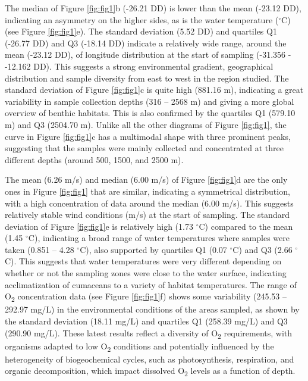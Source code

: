 The median of Figure \ref{fig:fig1}b (-26.21 DD) is lower than the mean (-23.12 DD), indicating an asymmetry on the higher sides, as is the water temperature ($^\circ$C) (see Figure \ref{fig:fig1}e). The standard deviation (5.52 DD) and quartiles Q1 (-26.77 DD) and Q3 (-18.14 DD) indicate a relatively wide range, around the mean (-23.12 DD), of longitude distribution at the start of sampling (-31.356 - -12.162 DD). This suggests a strong environmental gradient, geographical distribution and sample diversity from east to west in the region studied. The standard deviation of Figure \ref{fig:fig1}c is quite high (881.16 m), indicating a great variability in sample collection depths (316 – 2568 m) and giving a more global overview of benthic habitats. This is also confirmed by the quartiles Q1 (579.10 m) and Q3 (2504.70 m). Unlike all the other diagrams of Figure \ref{fig:fig1}, the curve in Figure \ref{fig:fig1}c has a multimodal shape with three prominent peaks, suggesting that the samples were mainly collected and concentrated at three different depths (around 500, 1500, and 2500 m).

The mean (6.26 m/s) and median (6.00 m/s) of Figure \ref{fig:fig1}d are the only ones in Figure \ref{fig:fig1} that are similar, indicating a symmetrical distribution, with a high concentration of data around the median (6.00 m/s). This suggests relatively stable wind conditions (m/s) at the start of sampling. The standard deviation of Figure \ref{fig:fig1}e is relatively high (1.73 $^\circ$C) compared to the mean (1.45 $^\circ$C), indicating a broad range of water temperatures where samples were taken (0.851 – 4.28 $^\circ$C), also supported by quartiles Q1 (0.07 $^\circ$C) and Q3 (2.66 $^\circ$C). This suggests that water temperatures were very different depending on whether or not the sampling zones were close to the water surface, indicating acclimatization of cumaceans to a variety of habitat temperatures. The range of O\textsubscript{2} concentration data (see Figure \ref{fig:fig1}f) shows some variability (245.53 – 292.97 mg/L) in the environmental conditions of the areas sampled, as shown by the standard deviation (18.11 mg/L) and quartiles Q1 (258.39 mg/L) and Q3 (290.90 mg/L). These latest results reflect a diversity of O\textsubscript{2} requirements, with organisms adapted to low O\textsubscript{2} conditions and potentially influenced by the heterogeneity of biogeochemical cycles, such as photosynthesis, respiration, and organic decomposition, which impact dissolved O\textsubscript{2} levels as a function of depth.


